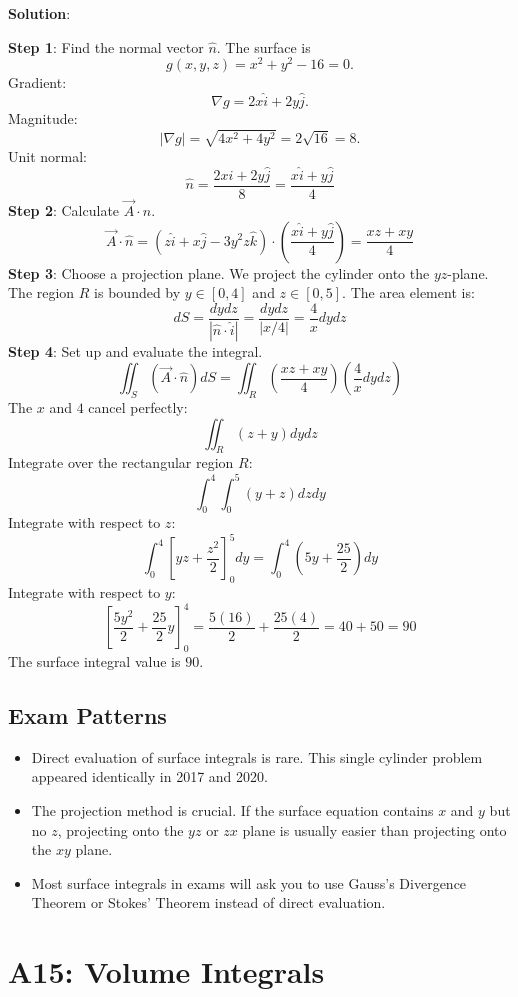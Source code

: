 \documentclass[
]{article}
\providecommand{\tightlist}{%
  \setlength{\itemsep}{0pt}\setlength{\parskip}{0pt}}
\begin{document}
\textbf{Solution}:

\textbf{Step 1}: Find the normal vector \(\hat{n}\). The surface is
\[
g(x,y,z) = x^2 + y^2 - 16 = 0.
\]
Gradient:
\[
\nabla g = 2x\hat{i} + 2y\hat{j}.
\]
Magnitude:
\[
\lvert \nabla g \rvert = \sqrt{4x^2 + 4y^2} = 2\sqrt{16} = 8.
\]
Unit normal:
\[
\hat{n} = \frac{2x\hat{i} + 2y\hat{j}}{8} = \frac{x\hat{i} + y\hat{j}}{4}
\]
\textbf{Step 2}: Calculate \(\vec{A} \cdot \hat{n}\).
\[
\vec{A} \cdot \hat{n} = (z\hat{i} + x\hat{j} - 3y^2z\hat{k}) \cdot \left( \frac{x\hat{i} + y\hat{j}}{4} \right) = \frac{xz + xy}{4}
\]
\textbf{Step 3}: Choose a projection plane. We project the cylinder onto
the \(yz\)-plane. The region \(R\) is bounded by \(y \in [0, 4]\) and
\(z \in [0, 5]\). The area element is:
\[
dS = \frac{dy dz}{|\hat{n} \cdot \hat{i}|} = \frac{dy dz}{|x/4|} = \frac{4}{x} dy dz
\]
\textbf{Step 4}: Set up and evaluate the integral.
\[
\iint_S (\vec{A} \cdot \hat{n}) dS = \iint_R \left( \frac{xz + xy}{4} \right) \left( \frac{4}{x} dy dz \right)
\]
The \(x\) and \(4\) cancel perfectly:
\[
\iint_R (z + y) dy dz
\]
Integrate over the rectangular region \(R\):
\[
\int_0^4 \int_0^5 (y + z) dz dy
\]
Integrate with respect to \(z\):
\[
\int_0^4 \left[ yz + \frac{z^2}{2} \right]_0^5 dy = \int_0^4 \left( 5y + \frac{25}{2} \right) dy
\]
Integrate with respect to \(y\):
\[
\left[ \frac{5y^2}{2} + \frac{25}{2}y \right]_0^4 = \frac{5(16)}{2} + \frac{25(4)}{2} = 40 + 50 = 90
\]
The surface integral value is \(90\).

\subsection{Exam Patterns}\label{exam-patterns-12}

\begin{itemize}
\tightlist
\item
  Direct evaluation of surface integrals is rare. This single cylinder
  problem appeared identically in 2017 and 2020.
\item
  The projection method is crucial. If the surface equation contains
  \(x\) and \(y\) but no \(z\), projecting onto the \(yz\) or \(zx\)
  plane is usually easier than projecting onto the \(xy\) plane.
\item
  Most surface integrals in exams will ask you to use Gauss's Divergence
  Theorem or Stokes' Theorem instead of direct evaluation.
\end{itemize}

\section{A15: Volume Integrals}\label{a15-volume-integrals}
\end{document}
